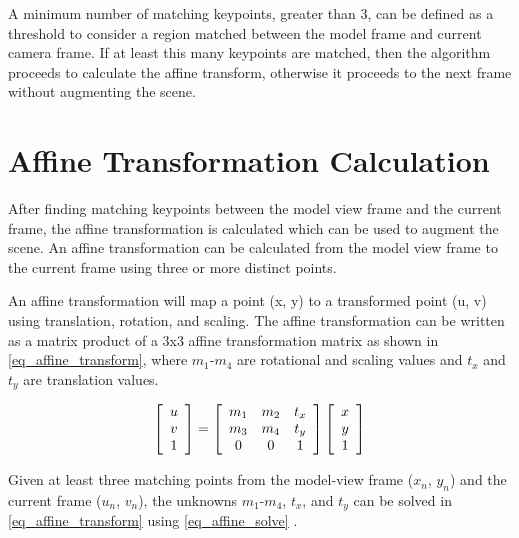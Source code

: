 \documentclass[oneside,11pt]{Latex/Classes/PhDthesisPSnPDF}
\begin{document}
A minimum number of matching keypoints, greater than 3, can be defined as a threshold to consider a region matched between the model frame and current camera frame.  If at least this many keypoints are matched, then the algorithm proceeds to calculate the affine transform, otherwise it proceeds to the next frame without augmenting the scene.

\section{Affine Transformation Calculation}

After finding matching keypoints between the model view frame and the current frame, the affine transformation is calculated which can be used to augment the scene.  An affine transformation can be calculated from the model view frame to the current frame using three or more distinct points.  

An affine transformation will map a point (x, y) to a transformed point (u, v) using translation, rotation, and scaling.  The affine transformation can be written as a matrix product of a 3x3 affine transformation matrix as shown in \ref{eq_affine_transform}, where $m_{1}$-$m_{4}$ are rotational and scaling values and $t_x$ and $t_y$ are translation values.

\begin{equation} 
\label{eq_affine_transform}
\left[
  \begin{array}{ c }
     u \\
     v \\
     1
  \end{array} 
\right]
=
\left[
  \begin{array}{ c c c }
     m_1 & m_2 & t_x \\
     m_3 & m_4 & t_y \\
     0 & 0 & 1
  \end{array} 
\right]
\left[
  \begin{array}{ c }
     x \\
     y \\
     1
  \end{array} 
\right]
\end{equation}

Given at least three matching points from the model-view frame ($x_n$, $y_n$) and the current frame ($u_n$, $v_n$), the unknowns $m_{1}$-$m_{4}$, $t_x$, and $t_y$ can be solved in \ref{eq_affine_transform} using \ref{eq_affine_solve} \cite{marano_09}.
\end{document}
